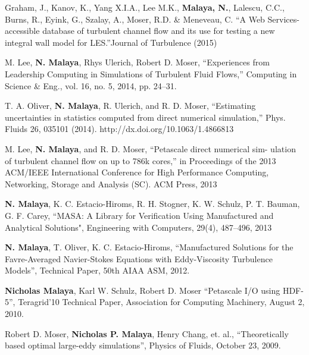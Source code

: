 %

 Graham, J., Kanov, K., Yang X.I.A., Lee M.K., \textbf{Malaya, N.}, 
Lalescu, C.C., Burns, R., Eyink, G., Szalay, A., Moser, R.D. \& 
Meneveau, C. ``A Web Services-accessible database of turbulent channel
flow and its use for testing a new integral wall model for LES.''Journal
of Turbulence  (2015)

\blankline

M. Lee, \textbf{N. Malaya}, Rhys Ulerich, Robert D. Moser,  “Experiences from
Leadership Computing in Simulations of Turbulent Fluid Flows,”
Computing in Science \& Eng., vol. 16, no. 5, 2014, pp. 24–31.

\blankline

T. A. Oliver, \textbf{N. Malaya}, R. Ulerich, and R. D. Moser, “Estimating
uncertainties in statistics computed from direct numerical simulation,”
Phys. Fluids 26, 035101 (2014). http://dx.doi.org/10.1063/1.4866813 

\blankline

M. Lee, \textbf{N. Malaya}, and R. D. Moser, ``Petascale direct numerical sim-
ulation of turbulent channel flow on up to 786k cores,'' in Proceedings
of the 2013 ACM/IEEE International Conference for High Performance
Computing, Networking, Storage and Analysis (SC). ACM Press, 2013 

\blankline

\textbf{N. Malaya}, K. C. Estacio-Hiroms, R. H. Stogner, K. W. Schulz, P. T. Bauman,
G. F. Carey, ``MASA: A Library for Verification Using Manufactured and
Analytical Solutions", Engineering with Computers, 29(4), 487--496, 2013

\blankline

\textbf{N. Malaya}, T. Oliver, K. C. Estacio-Hiroms, ``Manufactured Solutions for
the Favre-Averaged Navier-Stokes Equations 
with Eddy-Viscosity Turbulence Models'', Technical Paper, 50th AIAA ASM, 2012.

\blankline

\textbf{Nicholas Malaya}, Karl W. Schulz, Robert D. Moser
``Petascale I/O using HDF-5'', Teragrid'10 Technical Paper, Association for Computing Machinery,
August 2, 2010.

\blankline

Robert D. Moser, \textbf{Nicholas P. Malaya}, Henry Chang, et. al.,
``Theoretically based optimal large-eddy simulations'', Physics of Fluids, October 23, 2009.

